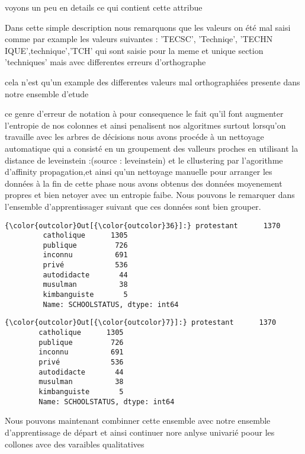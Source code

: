\documentclass[11pt]{article}
\begin{document}
    voyons un peu en details ce qui contient cette attribue

    Dans cette simple description nous remarquons que les valeurs on été mal
saisi comme par example les valeurs suivantes : 'TECSC', 'Techniqe',
'TECHN IQUE',technique','TCH' qui sont saisie pour la meme et unique
section 'techniques' mais avec differentes erreurs d'orthographe

    cela n'est qu'un example des differentes valeurs mal orthographiées
presente dans notre ensemble d'etude

    ce genre d'erreur de notation à pour consequence le fait qu'il font
augmenter l'entropie de nos colonnes et ainsi penalisent nos algoritmes
surtout lorsqu'on travaille avec les arbres de décisions nous avons
procéde à un nettoyage automatique qui a consisté en un groupement des
valleurs proches en utilisant la distance de leveinstein :(source :
leveinstein) et le cllustering par l'agorithme d'affinity propagation,et
ainsi qu'un nettoyage manuelle pour arranger les données à la fin de
cette phase nous avons obtenus des données moyenement propres et bien
netoyer avec un entropie faibe. Nous pouvons le remarquer dans
l'ensemble d'apprentissager suivant que ces données sont bien grouper.

            \begin{Verbatim}[commandchars=\\\{\}]
{\color{outcolor}Out[{\color{outcolor}36}]:} protestant      1370
         catholique      1305
         publique         726
         inconnu          691
         privé            536
         autodidacte       44
         musulman          38
         kimbanguiste       5
         Name: SCHOOLSTATUS, dtype: int64
\end{Verbatim}
        
            \begin{Verbatim}[commandchars=\\\{\}]
{\color{outcolor}Out[{\color{outcolor}7}]:} protestant      1370
        catholique      1305
        publique         726
        inconnu          691
        privé            536
        autodidacte       44
        musulman          38
        kimbanguiste       5
        Name: SCHOOLSTATUS, dtype: int64
\end{Verbatim}
        
    Nous pouvons maintenant combinner cette ensemble avec notre ensemble
d'apprentissage de départ et ainsi continuer nore anlyse univarié poour
les collones avce des varaibles qualitatives
\end{document}
